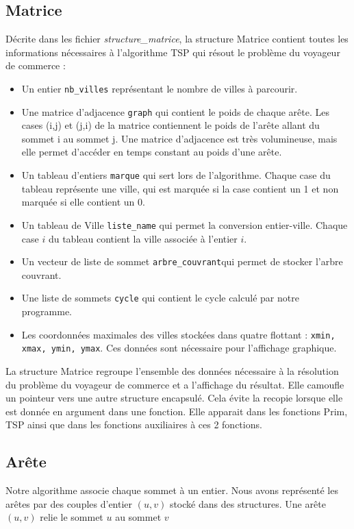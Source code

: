 \documentclass[a4paper,11pt]{article}
\begin{document}
\subsection{Matrice} %
Décrite dans les fichier \emph{structure\_matrice}, la structure \textsf{Matrice} contient toutes les informations nécessaires à l'algorithme TSP qui résout le problème du voyageur de commerce :
\begin{itemize}
\renewcommand{\FrenchLabelItem}{\textbullet}
\item Un entier \texttt{nb\_villes} représentant le nombre de villes à parcourir.
\item Une matrice d'adjacence \texttt{graph} qui contient le poids de chaque arête. Les cases (i,j) et (j,i) de la matrice contiennent le poids de l'arête allant du sommet i au sommet j. Une matrice d'adjacence est très volumineuse, mais elle permet d'accéder en temps constant au poids d'une arête.
\item Un tableau d'entiers \texttt{marque} qui sert lors de l'algorithme. Chaque case du tableau représente une ville, qui est marquée si la case contient un 1 et non marquée si elle contient un 0.
\item Un tableau de \textsf{Ville} \texttt{liste\_name} qui permet la conversion entier-ville. Chaque case $i$ du tableau contient la ville associée à l'entier $i$.
\item Un vecteur de liste de sommet \texttt{arbre\_couvrant}qui permet de stocker l'arbre couvrant.
\item Une liste de sommets \texttt{cycle} qui contient le cycle calculé par notre programme.
\item Les coordonnées maximales des villes stockées dans quatre flottant : \texttt{xmin, xmax, ymin, ymax}. Ces données sont nécessaire pour l'affichage graphique.
\end{itemize}

La structure Matrice regroupe l'ensemble des données nécessaire à la résolution du problème du voyageur de commerce et a l'affichage du résultat.
Elle camoufle un pointeur vers une autre structure encapsulé. Cela évite la recopie lorsque elle est donnée en argument dans une fonction. Elle apparait dans les fonctions Prim, TSP ainsi que dans les fonctions auxiliaires à ces 2 fonctions.\\

\subsection{Arête}
Notre algorithme associe chaque sommet à un entier. Nous avons représenté les arêtes par des couples d'entier $(u, v)$ stocké dans des structures. Une arête $(u, v)$ relie le sommet $u$ au sommet $v$
\end{document}
